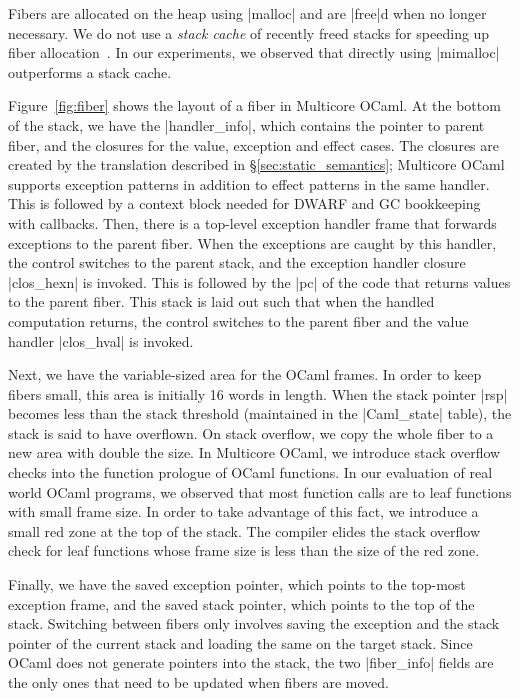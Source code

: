 \documentclass[sigplan,10pt,review,anonymous]{acmart}\settopmatter{printfolios=true,printccs=false,printacmref=false}
\begin{document}
Fibers are allocated on the heap using |malloc| and are |free|d when no longer
necessary. We do not use a \emph{stack cache} of recently freed stacks for
speeding up fiber allocation~\cite{Farvardin20}. In our experiments, we
observed that directly using |mimalloc|~\cite{Leijen19} outperforms a stack
cache.

Figure~\ref{fig:fiber} shows the layout of a fiber in Multicore OCaml. At the
bottom of the stack, we have the |handler_info|, which contains the pointer to
parent fiber, and the closures for the value, exception and effect cases. The
closures are created by the translation described in
\S\ref{sec:static_semantics}; Multicore OCaml supports exception patterns in
addition to effect patterns in the same handler. This is followed by a context
block needed for DWARF and GC bookkeeping with callbacks. Then, there is a
top-level exception handler frame that forwards exceptions to the parent fiber.
When the exceptions are caught by this handler, the control switches to the
parent stack, and the exception handler closure |clos_hexn| is invoked. This is
followed by the |pc| of the code that returns values to the parent
fiber. This stack is laid out such that when the handled computation returns,
the control switches to the parent fiber and the value handler |clos_hval|
is invoked.

Next, we have the variable-sized area for the OCaml frames. In order to keep
fibers small, this area is initially 16 words in length. When the stack pointer
|rsp| becomes less than the stack threshold (maintained in the |Caml_state|
table), the stack is said to have overflown. On stack overflow, we copy the
whole fiber to a new area with double the size. In Multicore OCaml, we
introduce stack overflow checks into the function prologue of OCaml functions.
In our evaluation of real world OCaml programs, we observed that most function
calls are to leaf functions with small frame size. In order to take advantage
of this fact, we introduce a small red zone at the top of the stack. The
compiler elides the stack overflow check for leaf functions whose frame size is
less than the size of the red zone.

Finally, we have the saved exception pointer, which points to the top-most
exception frame, and the saved stack pointer, which points to the top of the
stack. Switching between fibers only involves saving the exception and the
stack pointer of the current stack and loading the same on the target stack.
Since OCaml does not generate pointers into the stack, the two |fiber_info|
fields are the only ones that need to be updated when fibers are moved.
\end{document}
